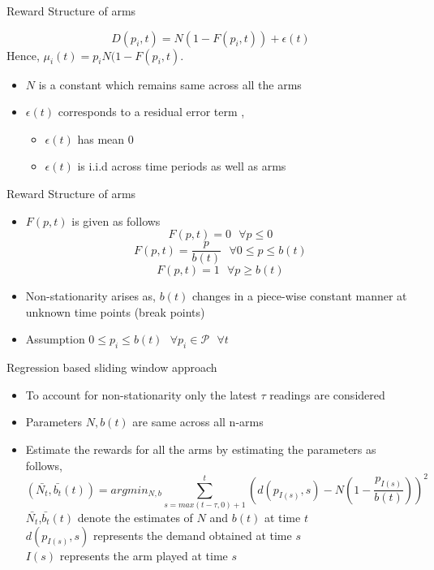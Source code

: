 \documentclass[compress, serif, onlymath, professionalfonts]{beamer}
\begin{document}
\begin{frame}{Reward Structure of arms}

$$D(p_i,t)=N(1-F(p_i,t))+ \epsilon(t)$$
Hence, $\mu_i(t)=p_iN(1-F(p_i,t).$
\begin{itemize}
\item $N$ is a constant which remains same across all the arms
\item $\epsilon(t)$ corresponds to a residual error term ,
\begin{itemize}
\item $\epsilon(t)$ has mean $0$ 	
\item  $\epsilon(t)$ is i.i.d across time periods as well as arms
\end{itemize}




\end{itemize}





\end{frame}
\begin{frame}{Reward Structure of arms}
\begin{itemize}
\item $F(p,t )$ is given as follows
$$F(p,t) = 0\text{\ \ \ \ \ \ \ \    }\forall p \leq 0  $$
$$F(p,t) = \frac{p}{b(t)} \text{\ \ \ \ \ \ \ \    }\forall  0 \leq p \leq b(t)  $$
$$F(p,t) = 1 \text{\ \ \ \ \ \ \ \    } \forall   p \geq b(t)  $$
\item Non-stationarity arises as, $b(t)$ changes in a piece-wise constant manner at unknown time points (break points)

\item Assumption $0 \leq  p_i \leq b(t) \text{\ \ \ \ \ \ \ \    }  \forall p_i  \in \mathcal{P} \text{\ \ \ \ \ \ \ \    } \forall t$


\end{itemize}
\end{frame}

\begin{frame}{Regression based sliding window approach}
\begin{itemize}
\item To account for non-stationarity only the latest $\tau$ readings are considered
\item Parameters $N, b(t)$ are same across all n-arms
\item Estimate the rewards for all the arms by estimating the parameters as follows,
$$(\bar{N_t},\bar{b_t}(t))=  argmin_{N,b} \sum_{s=max(t-\tau,0)+1}^{t} (d(p_{I(s)},s)- N(1-\frac{p_{I(s)}}{b(t)}))^2 $$
$ \bar{N_t}$,$\bar{b_t}(t)$ denote the estimates of $N$ and $b(t)$ at time $t$\\
$d(p_{I(s)},s)$ represents the demand obtained at time $s$\\
$I(s)$ represents the arm played at time $s$
\end{itemize}
\end{frame}
\end{document}
